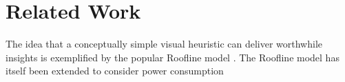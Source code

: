 \section{Related Work}
The idea that a conceptually simple visual heuristic can deliver worthwhile insights is exemplified by the popular Roofline model \cite{williams:2009aa}. The Roofline model has itself been extended to consider power consumption \cite{choi:2013aa}  
